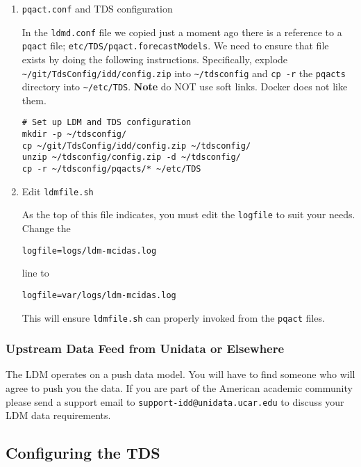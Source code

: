 \documentclass[11pt]{article}
\begin{document}
\begin{enumerate}
\item \texttt{pqact.conf} and TDS configuration
\label{sec:orgheadline20}

In the \texttt{ldmd.conf} file we copied just a moment ago there is a reference to a \texttt{pqact} file; \texttt{etc/TDS/pqact.forecastModels}. We need to ensure that file exists by doing the following instructions. Specifically, explode \texttt{\textasciitilde{}/git/TdsConfig/idd/config.zip} into \texttt{\textasciitilde{}/tdsconfig} and \texttt{cp -r} the \texttt{pqacts} directory into \texttt{\textasciitilde{}/etc/TDS}. \textbf{Note} do NOT use soft links. Docker does not like them.

\begin{verbatim}
# Set up LDM and TDS configuration
mkdir -p ~/tdsconfig/
cp ~/git/TdsConfig/idd/config.zip ~/tdsconfig/
unzip ~/tdsconfig/config.zip -d ~/tdsconfig/
cp -r ~/tdsconfig/pqacts/* ~/etc/TDS
\end{verbatim}

\item Edit \texttt{ldmfile.sh}
\label{sec:orgheadline21}
\label{orgtarget1}

As the top of this file indicates, you must edit the \texttt{logfile} to suit your needs. Change the 

\begin{verbatim}
logfile=logs/ldm-mcidas.log
\end{verbatim}

line to

\begin{verbatim}
logfile=var/logs/ldm-mcidas.log
\end{verbatim}

This will ensure \texttt{ldmfile.sh} can properly invoked from the \texttt{pqact} files.
\end{enumerate}

\subsubsection{Upstream Data Feed from Unidata or Elsewhere}
\label{sec:orgheadline23}

The LDM operates on a push data model. You will have to find someone who will agree to push you the data. If you are part of the American academic community please send a support email to \texttt{support-idd@unidata.ucar.edu} to discuss your LDM data requirements.
\subsection{Configuring the TDS}
\label{sec:orgheadline26}
\end{document}

